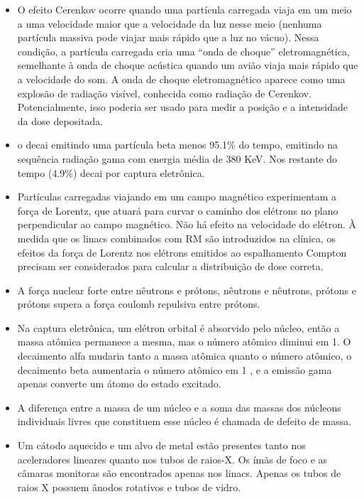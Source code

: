 \documentclass[11pt,a4paper]{article}
\newcounter{exemplo}
\begin{document}
\begin{exemplo}[Física]
\begin{itemize}
        \item O efeito Cerenkov ocorre quando uma partícula carregada viaja em um meio a uma velocidade maior que a velocidade da luz nesse meio (nenhuma partícula massiva pode viajar mais rápido que a luz no vácuo). Nessa condição, a partícula carregada cria uma “onda de choque” eletromagnética, semelhante à onda de choque acústica quando um avião viaja mais rápido que a velocidade do som. A onda de choque eletromagnético aparece como uma explosão de radiação visível, conhecida como radiação de Cerenkov. Potencialmente, isso poderia ser usado para medir a posição e a intensidade da dose depositada.
        
        \item o  decai emitindo uma partícula beta menos 95.1\% do tempo, emitindo na sequência radiação gama com energia média de 380 KeV. Nos restante do tempo (4.9\%) decai por captura eletrônica.
        
        \item Partículas carregadas viajando em um campo magnético experimentam a força de Lorentz, que atuará para curvar o caminho dos elétrons no plano perpendicular ao campo magnético. Não há efeito na velocidade do elétron. À medida que os linacs combinados com RM são introduzidos na clínica, os efeitos da força de Lorentz nos elétrons emitidos ao espalhamento Compton precisam ser considerados para calcular a distribuição de dose correta.
        
        \item A força nuclear forte entre nêutrons e prótons, nêutrons e nêutrons, prótons e prótons supera a força coulomb repulsiva entre prótons. 
        
        \item Na captura eletrônica, um elétron orbital é absorvido pelo núcleo, então a massa atômica permanece a mesma, mas o número atômico diminui em 1. O decaimento alfa mudaria tanto a massa atômica quanto o número atômico, o decaimento beta aumentaria o número atômico em 1 , e a emissão gama apenas converte um átomo do estado excitado.
        
        \item A diferença entre a massa de um núcleo e a soma das massas dos núcleons individuais livres que constituem esse núcleo é chamada de defeito de massa.
        
        \item Um cátodo aquecido e um alvo de metal estão presentes tanto nos aceleradores lineares quanto nos tubos de raios-X. Os ímãs de foco e as câmaras monitoras são encontrados apenas nos linacs. Apenas os tubos de raios X possuem ânodos rotativos e tubos de vidro.
        

\end{itemize}
\end{exemplo}
\end{document}
